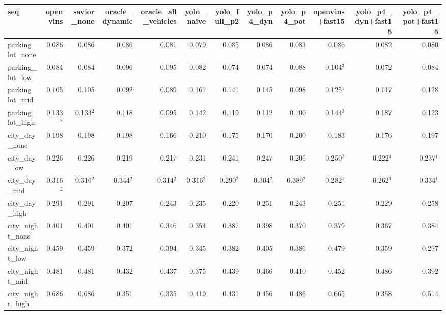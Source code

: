 \begin{tabular}{lrrrrrrrrrrr}
\toprule
seq & openvins & savior\_none & oracle\_dynamic & oracle\_all\_vehicles & yolo\_naive & yolo\_full\_p2 & yolo\_p4\_dyn & yolo\_p4\_pot & openvins+fast15 & yolo\_p4\_dyn+fast15 & yolo\_p4\_pot+fast15 \\
\midrule
parking\_lot\_none & 0.086 & 0.086 & 0.086 & 0.081 & 0.079 & 0.085 & 0.086 & 0.083 & 0.086 & 0.082 & 0.080 \\
parking\_lot\_low & 0.084 & 0.084 & 0.096 & 0.095 & 0.082 & 0.074 & 0.074 & 0.088 & 0.104$^{3}$ & 0.072 & 0.084 \\
parking\_lot\_mid & 0.105 & 0.105 & 0.092 & 0.089 & 0.167 & 0.141 & 0.145 & 0.098 & 0.125$^{1}$ & 0.117 & 0.128 \\
parking\_lot\_high & 0.133$^{2}$ & 0.133$^{2}$ & 0.118 & 0.095 & 0.142 & 0.119 & 0.112 & 0.100 & 0.144$^{3}$ & 0.187 & 0.123 \\
city\_day\_none & 0.198 & 0.198 & 0.198 & 0.166 & 0.210 & 0.175 & 0.170 & 0.200 & 0.183 & 0.176 & 0.197 \\
city\_day\_low & 0.226 & 0.226 & 0.219 & 0.217 & 0.231 & 0.241 & 0.247 & 0.206 & 0.250$^{2}$ & 0.222$^{1}$ & 0.237$^{1}$ \\
city\_day\_mid & 0.316$^{2}$ & 0.316$^{2}$ & 0.344$^{2}$ & 0.314$^{2}$ & 0.316$^{2}$ & 0.290$^{2}$ & 0.304$^{2}$ & 0.389$^{2}$ & 0.282$^{1}$ & 0.262$^{1}$ & 0.334$^{1}$ \\
city\_day\_high & 0.291 & 0.291 & 0.207 & 0.243 & 0.235 & 0.220 & 0.251 & 0.243 & 0.251 & 0.229 & 0.258 \\
city\_night\_none & 0.401 & 0.401 & 0.401 & 0.346 & 0.354 & 0.387 & 0.398 & 0.370 & 0.379 & 0.367 & 0.384 \\
city\_night\_low & 0.459 & 0.459 & 0.372 & 0.394 & 0.345 & 0.382 & 0.405 & 0.386 & 0.479 & 0.359 & 0.297 \\
city\_night\_mid & 0.481 & 0.481 & 0.432 & 0.437 & 0.375 & 0.439 & 0.466 & 0.410 & 0.452 & 0.486 & 0.392 \\
city\_night\_high & 0.686 & 0.686 & 0.351 & 0.335 & 0.419 & 0.431 & 0.456 & 0.486 & 0.665 & 0.358 & 0.514 \\
\bottomrule
\end{tabular}
